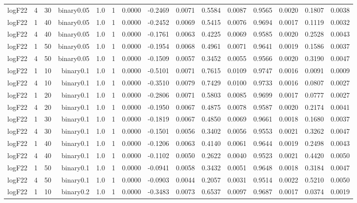 \begin{longtable}{rrrrrrrrrrrrrrr}
  logF22 & 4 & 30 & binary0.05 & 1.0 & 1 & 0.0000 & -0.2469 & 0.0071 & 0.5584 & 0.0087 & 0.9565 & 0.0020 & 0.1807 & 0.0038 \\ 
  logF22 & 1 & 40 & binary0.05 & 1.0 & 1 & 0.0000 & -0.2452 & 0.0069 & 0.5415 & 0.0076 & 0.9694 & 0.0017 & 0.1119 & 0.0032 \\ 
  logF22 & 4 & 40 & binary0.05 & 1.0 & 1 & 0.0000 & -0.1761 & 0.0063 & 0.4225 & 0.0069 & 0.9585 & 0.0020 & 0.2528 & 0.0043 \\ 
  logF22 & 1 & 50 & binary0.05 & 1.0 & 1 & 0.0000 & -0.1954 & 0.0068 & 0.4961 & 0.0071 & 0.9641 & 0.0019 & 0.1586 & 0.0037 \\ 
  logF22 & 4 & 50 & binary0.05 & 1.0 & 1 & 0.0000 & -0.1509 & 0.0057 & 0.3452 & 0.0055 & 0.9566 & 0.0020 & 0.3190 & 0.0047 \\ 
  logF22 & 1 & 10 & binary0.1 & 1.0 & 1 & 0.0000 & -0.5101 & 0.0071 & 0.7615 & 0.0109 & 0.9747 & 0.0016 & 0.0091 & 0.0009 \\ 
  logF22 & 4 & 10 & binary0.1 & 1.0 & 1 & 0.0000 & -0.3510 & 0.0079 & 0.7429 & 0.0100 & 0.9733 & 0.0016 & 0.0807 & 0.0027 \\ 
  logF22 & 1 & 20 & binary0.1 & 1.0 & 1 & 0.0000 & -0.2806 & 0.0071 & 0.5803 & 0.0085 & 0.9699 & 0.0017 & 0.0777 & 0.0027 \\ 
  logF22 & 4 & 20 & binary0.1 & 1.0 & 1 & 0.0000 & -0.1950 & 0.0067 & 0.4875 & 0.0078 & 0.9587 & 0.0020 & 0.2174 & 0.0041 \\ 
  logF22 & 1 & 30 & binary0.1 & 1.0 & 1 & 0.0000 & -0.1819 & 0.0067 & 0.4850 & 0.0069 & 0.9661 & 0.0018 & 0.1680 & 0.0037 \\ 
  logF22 & 4 & 30 & binary0.1 & 1.0 & 1 & 0.0000 & -0.1501 & 0.0056 & 0.3402 & 0.0056 & 0.9553 & 0.0021 & 0.3262 & 0.0047 \\ 
  logF22 & 1 & 40 & binary0.1 & 1.0 & 1 & 0.0000 & -0.1206 & 0.0063 & 0.4140 & 0.0061 & 0.9644 & 0.0019 & 0.2498 & 0.0043 \\ 
  logF22 & 4 & 40 & binary0.1 & 1.0 & 1 & 0.0000 & -0.1102 & 0.0050 & 0.2622 & 0.0040 & 0.9523 & 0.0021 & 0.4420 & 0.0050 \\ 
  logF22 & 1 & 50 & binary0.1 & 1.0 & 1 & 0.0000 & -0.0941 & 0.0058 & 0.3432 & 0.0051 & 0.9648 & 0.0018 & 0.3184 & 0.0047 \\ 
  logF22 & 4 & 50 & binary0.1 & 1.0 & 1 & 0.0000 & -0.0903 & 0.0044 & 0.2057 & 0.0031 & 0.9514 & 0.0022 & 0.5210 & 0.0050 \\ 
  logF22 & 1 & 10 & binary0.2 & 1.0 & 1 & 0.0000 & -0.3483 & 0.0073 & 0.6537 & 0.0097 & 0.9687 & 0.0017 & 0.0374 & 0.0019 \\ 

\end{longtable}

